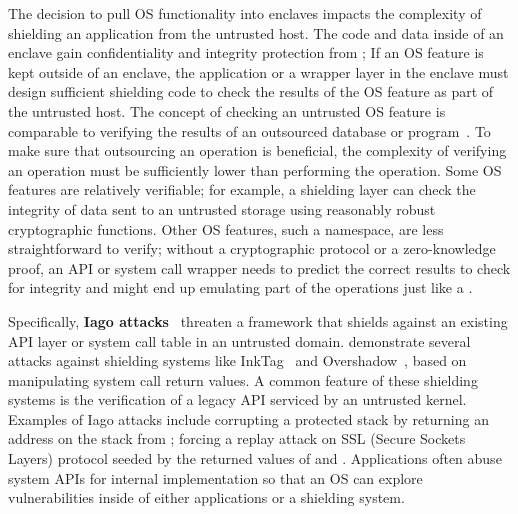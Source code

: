 The decision to pull OS functionality into enclaves
impacts the complexity of shielding an application from the untrusted host.
The code and data inside of an enclave
gain confidentiality and integrity protection from \sgx{};
If an OS feature is kept outside of an enclave, the application or a wrapper layer in the enclave must design
sufficient shielding code to check the results of the OS feature
as part of the untrusted host.
The concept of checking an untrusted OS feature
is comparable to verifying the results of an outsourced database or program~\cite{bajaj13correctdb,zhang15integridb,ben2013snarks}.
To make sure that outsourcing an operation is beneficial,
the complexity of verifying an operation must be sufficiently lower than performing the operation.
Some OS features are relatively verifiable;
for example, a shielding layer can check the integrity of data sent to an untrusted storage using reasonably robust cryptographic functions.
Other OS features, such a namespace, are less straightforward to verify;
without a cryptographic protocol or a zero-knowledge proof,
an API or system call wrapper needs to predict the correct results to check for integrity and might end up emulating part of the operations just like a \libos{}.



Specifically, {\bf Iago attacks}~\cite{checkoway13iago}
threaten a framework that shields against an existing API layer or system call table in an untrusted domain.
\citeauthor{checkoway13iago}
demonstrate several attacks against shielding systems like InkTag~\cite{inktag} and Overshadow~\cite{overshadow}, based on manipulating system call return values.
A common feature of these shielding systems
is the verification of a legacy API serviced by an untrusted kernel.
Examples of Iago attacks include
corrupting a protected stack by returning an address on the stack from ;
forcing a replay attack on SSL (Secure Sockets Layers) protocol
seeded by the returned values of  and .
Applications often abuse system APIs for internal implementation so that an OS can explore vulnerabilities inside of either applications or a shielding system.



